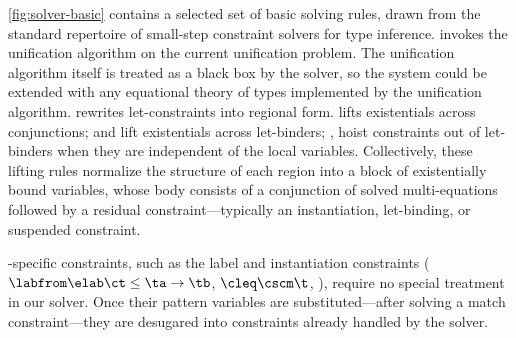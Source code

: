 \documentclass[acmsmall,screen,nonacm%
\Anonymous{,anonymous}{}%
\Final{}{,review}%
]{acmart}
\providecommand{\DIFdel}[1]{\protect\cbdelete{\protect\color{red}#1}\protect\cbdelete} %
\providecommand{\DIFaddbegin}{} %
\providecommand{\DIFaddend}{} %
\providecommand{\DIFdelbegin}{} %
\providecommand{\DIFdelend}{} %
\begin{document}


\cref{fig:solver-basic} contains a selected set of basic solving rules, drawn
from the standard repertoire of small-step constraint solvers for \ML type inference.
%
%
 invokes the unification algorithm on the
current unification problem. The unification algorithm itself is treated as a
black box by the solver, so the system could be extended with any
equational theory of types implemented by the unification algorithm.
%
 rewrites let-constraints into regional form.
%
 lifts existentials across conjunctions;
 and  lift existentials across
let-binders; ,  hoist constraints
out of let-binders when they are independent of the local variables.
%
Collectively, these lifting rules normalize the structure of each region into a
block of existentially bound variables, whose body consists of a conjunction of
solved multi-equations followed by a residual constraint---typically an
instantiation, let-binding, or suspended constraint.


\OML-specific constraints, such as the label and \DIFdelbegin \DIFdel{polytype }\DIFdelend \DIFaddbegin \polytype \DIFaddend instantiation
constraints ($\labfrom \elab \ct \leq \ta \to \tb$, $\cleq \cscm \t$,
\etc), require no special treatment in our solver. Once their pattern variables
are substituted---after solving a match constraint---they are desugared into
constraints already handled by the solver.


\DIFdelbegin %
\end{document}
